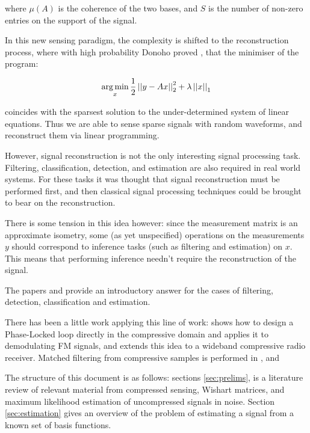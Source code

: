 where \( \mu(A)\) is the coherence of the two bases, and \(S\) is the number of non-zero entries on the support of the signal. 

In this new sensing paradigm, the complexity is shifted to the reconstruction process, where with high probability Donoho proved \cite{donoho2004neighborly}, that the minimiser of the program:

\begin{equation}
\operatorname*{arg\,min}_{x} \frac{1}{2}\left|\left|y-Ax\right|\right|_2^2 + \lambda\left|\left|x\right|\right|_1
\end{equation}

coincides with the sparsest solution to the under-determined system of linear equations. Thus we are able to sense sparse signals with random waveforms, and reconstruct them via linear programming.

However, signal reconstruction is not the only interesting signal processing task. Filtering, classification, detection, and estimation are also required in real world systems. For these tasks it was thought that signal reconstruction must be performed first, and then classical signal processing techniques could be brought to bear on the reconstruction. 

There is some tension in this idea however: since the measurement matrix is an approximate isometry, some (as yet unspecified) operations on the measurements \(y\) should correspond to inference tasks (such as filtering and estimation) on \(x\). This means that performing inference needn’t require the reconstruction of the signal. 

The papers \cite{davenport2010signal} and \cite{davenport2007smashed} provide an introductory answer for the cases of filtering, detection, classification and estimation.

There has been a little work applying this line of work: \cite{schnelle2012compressive} shows how to design a Phase-Locked loop directly in the compressive domain and applies it to demodulating FM signals, and \cite{davenport2010wideband} extends this idea to a wideband compressive radio receiver. Matched filtering from compressive samples is performed in \cite{eftekhari2013matched}, and 

The structure of this document is as follows: sections \eqref{sec:prelims}, is a literature review of relevant material from compressed sensing, Wishart matrices, and maximum likelihood estimation of uncompressed signals in noise. Section \eqref{sec:estimation} gives an overview of the problem of estimating a signal from a known set of basis functions. 



